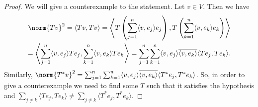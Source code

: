 \documentclass{extarticle}
\begin{document}
\begin{proof}
    We will give a counterexample to the statement. Let \( v \in V \). Then we have
    \begin{align*}
        \norm{Tv}^2 = \langle Tv, Tv \rangle =
        \left\langle
            T \left(\sum_{j=1}^{n} \langle v, e_j \rangle e_j\right),
            T \left(\sum_{k=1}^{n} \langle v, e_k \rangle e_k \right)
        \right\rangle
        \\ =
        \left\langle
            \sum_{j=1}^{n} \langle v, e_j \rangle  T e_j,
            \sum_{k=1}^{n} \langle v, e_k \rangle T e_k
        \right\rangle
        =
        \sum_{j=1}^{n}\sum_{k=1}^{n}
        \langle v, e_j \rangle  \overline {\langle v, e_k \rangle}
        \langle T e_j, T e_k \rangle.
    \end{align*}
    Similarly, \( \norm{T^* v}^2 = \sum_{j=1}^{n}\sum_{k=1}^{n}
        \langle v, e_j \rangle  \overline {\langle v, e_k \rangle}
        \langle T^* e_j, T^* e_k \rangle \).
        So, in order to give a counterexample
        we need to find some \( T \) such that
        it satisfies the hypothesis and
        \(\sum_{j \ne k} \langle T e_j, T e_k \rangle
        \ne \sum_{j \ne k} \langle T^* e_j, T^* e_k \rangle \).


\end{proof}
\end{document}
